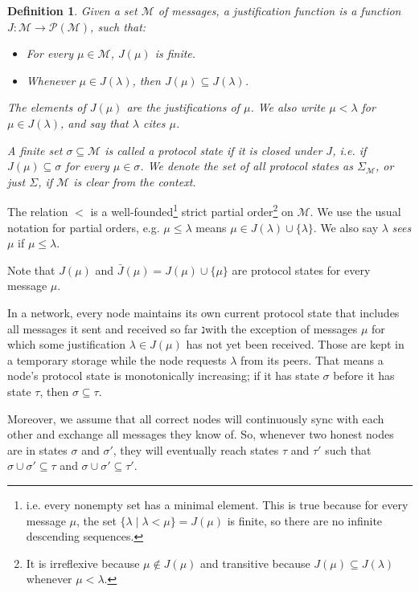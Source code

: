 \documentclass[12pt, fleqn]{article}
\newtheorem{definition}{Definition}
\begin{document}
\begin{definition}
  Given a set $\mathcal{M}$ of \emph{messages}, a \emph{justification function} is a function $J: \mathcal{M} \rightarrow \mathcal{P}(\mathcal{M})$, such that:
  \begin{itemize}
    \item For every $\mu \in \mathcal{M}$, $J(\mu)$ is finite.
    \item Whenever $\mu \in J(\lambda)$, then $J(\mu) \subseteq J(\lambda)$.
  \end{itemize}
  The elements of $J(\mu)$ are the \emph{justifications} of $\mu$. We also write $\mu < \lambda$ for $\mu \in J(\lambda)$, and say that $\lambda$ \emph{cites} $\mu$.

  A finite set $\sigma \subseteq \mathcal{M}$ is called a \emph{protocol state} if it is closed under $J$, i.e. if $J(\mu) \subseteq \sigma$ for every $\mu \in \sigma$. We denote the set of all protocol states as $\Sigma_{\mathcal{M}}$, or just $\Sigma$, if $\mathcal{M}$ is clear from the context.
\end{definition}

The relation $<$ is a well-founded\footnote{i.e. every nonempty set has a minimal element. This is true because for every message $\mu$, the set $\{ \lambda \mid \lambda < \mu \} = J(\mu)$ is finite, so there are no infinite descending sequences.} strict partial order\footnote{It is irreflexive because $\mu \notin J(\mu)$ and transitive because $J(\mu) \subseteq J(\lambda)$ whenever $\mu < \lambda$.} on $\mathcal{M}$. We use the usual notation for partial orders, e.g. $\mu \leq \lambda$ means $\mu \in J(\lambda) \cup \{\lambda\}$. We also say $\lambda$ \emph{sees} $\mu$ if $\mu \leq \lambda$.

Note that $J(\mu)$ and $\bar{J}(\mu) = J(\mu) \cup \{\mu\}$ are protocol states for every message $\mu$.

In a network, every node maintains its own current protocol state that includes all messages it sent and received so far נwith the exception of messages $\mu$ for which some justification $\lambda \in J(\mu)$ has not yet been received. Those are kept in a temporary storage while the node requests $\lambda$ from its peers. That means a node's protocol state is monotonically increasing; if it has state $\sigma$ before it has state $\tau$, then $\sigma \subseteq \tau$.

Moreover, we assume that all correct nodes will continuously sync with each other and exchange all messages they know of. So, whenever two honest nodes are in states $\sigma$ and $\sigma'$, they will eventually reach states $\tau$ and $\tau'$ such that $\sigma \cup \sigma' \subseteq \tau$ and $\sigma \cup \sigma' \subseteq \tau'$.
\end{document}
